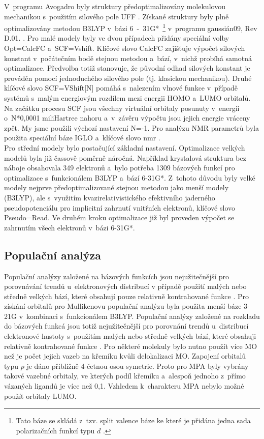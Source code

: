 \documentclass[
digital, %
table,   %
lof,     %
lot,     %
oneside,
]{fithesis3}
\begin{document}
V~programu Avogadro byly struktury předoptimalizovány molekulovou mechanikou s~použitím silového pole UFF \cite{uff_force_filed}. Získané struktury byly plně optimalizovány metodou B3LYP \cite{b3lyp} v~bázi 6~-~31G*~\footnote{Tato báze se skládá z~tzv. split valence báze \cite{ditchfield1971self} ke které je přidána jedna sada polarizačních funkcí typu $d$ \cite{francl1982self}.} v~programu gaussián09, Rev D.01. \cite{g09}. Pro malé modely byly ve dvou případech přidány speciální volby Opt=CalcFC a~SCF=Vshift. Klíčové slovo CalcFC zajišťuje výpočet silových konstant v~počátečním bodě stejnou metodou a~bází, v~nichž probíhá samotná optimalizace. Předvolba totiž stanovuje, že původní odhad silových konstant je prováděn pomocí jednoduchého silového pole (tj. klasickou mechanikou). Druhé klíčové slovo SCF=VShift[N] pomáhá s~nalezením vlnové funkce v~případě systémů s~malým energiovým rozdílem mezi energii HOMO a~LUMO orbitalů. Na začátku procesu SCF jsou všechny virtuální orbitaly posunuty v~energii o~N*0,0001 miliHartree nahoru a~v~závěru výpočtu jsou jejich energie vráceny zpět. My jsme použili výchozí nastavení N=-1. Pro analýzu NMR parametrů byla použita speciální báze IGLO \cite{iglo} a~klíčové slovo nmr \cite{g09}. \\
Pro střední modely bylo postačující základní nastavení. Optimalizace velkých modelů byla již čassově poměrně náročná. Například krystalová struktura bez náboje obsahovala 349 elektronů a~bylo potřeba 1309 bázových funkcí pro optimalizace s~funkcionálem B3LYP a~bází 6-31G*. Z~tohoto důvodu byly velké modely nejprve předoptimalizované stejnou metodou jako menší modely (B3LYP), ale s~využitím kvazirelativistického efektivního jaderného pseudopotenciálu pro implicitní zahrnutí vnitřních elektronů, klíčové slovo Pseudo=Read. Ve druhém kroku optimalizace již byl proveden výpočet se zahrnutím všech elektronů v~bázi 6-31G*.\\
\subsection{Populační analýza}
Populační analýzy založené na bázových funkcích jsou nejužitečnější pro porovnávání trendů u~elektronových distribucí v případě použití malých nebo středně velkých bází, které obsahují pouze relativně kontrahované funkce \cite{jensen2007introduction}.
Pro získání orbitalů pro Mullikenovu populační analýzu byla použita menší báze 3-21G \cite{binkley1980self} v~kombinaci s~funkcionálem B3LYP. Populační analýzy založené na rozkladu do bázových funkcá jsou totiž nejužitečnější pro porovnání trendů u~distribucí elektronové hustoty s~použitím malých nebo středně velkých bází, které obsahuji relativně kontrahované funkce \cite{jensen2007introduction}. Pro některé molekuly bylo nutno použít více MO než je počet
jejich vazeb na křemíku kvůli delokalizaci MO. Zapojení orbitalů typu $p$ je dáno
přibližně 4-četnou osou symetrie. Proto pro MPA byly
vybrány takové vazebné orbitaly, ve kterých podíl křemíku a~alespoň
jednoho z~přímo vázaných ligandů je více než 0,1. Vzhledem k~charakteru
MPA nebylo možné použít orbitaly LUMO. \\
\end{document}
